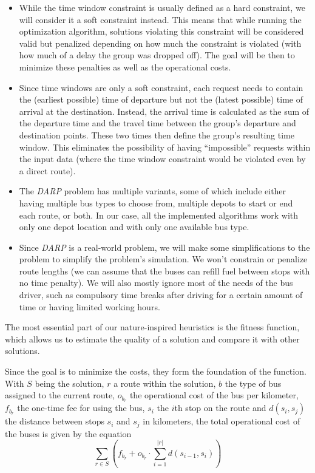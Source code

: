 \begin{itemize}
    \item While the time window constraint is usually defined as a hard constraint, we will consider it a soft constraint instead. This means that while running the optimization algorithm, solutions violating this constraint will be considered valid but penalized depending on how much the constraint is violated (with how much of a delay the group was dropped off). The goal will be then to minimize these penalties as well as the operational costs.
    \item Since time windows are only a soft constraint, each request needs to contain the (earliest possible) time of departure but not the (latest possible) time of arrival at the destination. Instead, the arrival time is calculated as the sum of the departure time and the travel time between the group's departure and destination points. These two times then define the group's resulting time window. This eliminates the possibility of having ``impossible'' requests within the input data (where the time window constraint would be violated even by a direct route).
    \item The \textit{DARP} problem has multiple variants, some of which include either having multiple bus types to choose from, multiple depots to start or end each route, or both. In our case, all the implemented algorithms work with only one depot location and with only one available bus type.  
    \item Since \textit{DARP} is a real-world problem, we will make some simplifications to the problem to simplify the problem's simulation. We won't constrain or penalize route lengths (we can assume that the buses can refill fuel between stops with no time penalty). We will also mostly ignore most of the needs of the bus driver, such as compulsory time breaks after driving for a certain amount of time or having limited working hours.
\end{itemize}

\label{sec:fitness}

The most essential part of our nature-inspired heuristics is the fitness function, which allows us to estimate the quality of a solution and compare it with other solutions.

Since the goal is to minimize the costs, they form the foundation of the function. With $S$ being the solution, $r$ a route within the solution, $b$ the type of bus assigned to the current route, $o_{b_r}$ the operational cost of the bus per kilometer, $f_{b_r}$ the one-time fee for using the bus, $s_i$ the $i$th stop on the route and $d(s_i, s_j)$ the distance between stops $s_i$ and $s_j$ in kilometers, the total operational cost of the buses is given by the equation
\begin{equation}\label{eq:fitness_costs}
    \sum_{r \in S} ( f_{b_r} + o_{b_r} \cdot \sum_{i=1}^{|r|}d(s_{i-1},s_{i}))
\end{equation}

